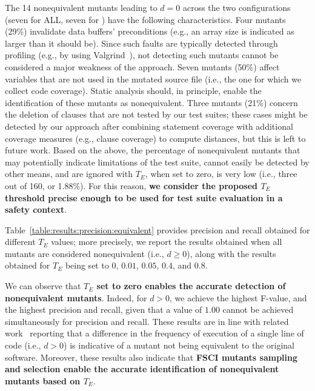 The 14 nonequivalent mutants leading to $d=0$ across the two configurations (seven for ALL, seven for \APPR) have the following characteristics.
Four mutants (29\%) invalidate data buffers' preconditions (e.g., an array size is indicated as larger than it should be). Since such faults are typically detected through profiling (e.g., by using Valgrind~\cite{Valgrind}), not detecting such mutants cannot be considered a major weakness of the approach. Seven mutants (50\%) affect variables that are not used in the mutated source file (i.e., the one for which we collect code coverage).
Static analysis should, in principle, enable the identification of these mutants as nonequivalent.
Three mutants (21\%) concern the deletion of clauses that are not tested by our test suites; these cases might be detected by our approach after combining statement coverage with additional coverage measures (e.g., clause coverage) to compute distances, but this is left to future work. Based on the above, the percentage of nonequivalent mutants that
may potentially indicate limitations of the test suite, cannot easily be detected by other means,
and are ignored with $T_E$, when set to zero, is very low
 (i.e., three out of 160, or 1.88\%). For this reason, \textbf{we consider the proposed $T_E$ threshold precise enough to be used for test suite evaluation in a safety context}.

Table~\ref{table:results:precision:equivalent} provides precision and recall obtained for different $T_E$ values; more precisely, we report the results obtained when all mutants are considered nonequivalent (i.e., $d\ge0$), along with the results obtained for $T_E$ being set to $0$, $0.01$, $0.05$, $0.4$, and $0.8$.



 We can observe that \textbf{$T_E$ set to zero enables the accurate detection of nonequivalent mutants}. Indeed,
for $d>0$, we achieve the highest F-value, and the highest precision and recall, given that a value of $1.00$ cannot be achieved simultaneously for precision and recall.
These results are in line with related work~\cite{zhang2013faster} reporting that a difference in the frequency of execution of a single line of code (i.e., $d>0$) is indicative of a mutant not being equivalent to the original software.
Moreover, these results also indicate that \textbf{FSCI mutants sampling and \MPTS selection enable the accurate identification of nonequivalent mutants based on $T_E$}.




